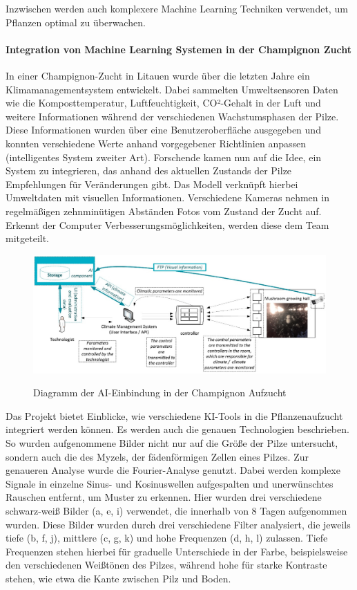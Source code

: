 Inzwischen werden auch komplexere Machine Learning Techniken verwendet, um Pflanzen optimal zu überwachen.

\paragraph{Integration von Machine Learning Systemen in der Champignon Zucht\cite{barauskas2022approach}}
In einer Champignon-Zucht in Litauen wurde über die letzten Jahre ein Klimamanagementsystem entwickelt. Dabei sammelten Umweltsensoren Daten wie die Komposttemperatur, Luftfeuchtigkeit, CO²-Gehalt in der Luft und weitere Informationen während der verschiedenen Wachstumsphasen der Pilze. Diese Informationen wurden über eine Benutzeroberfläche ausgegeben und konnten verschiedene Werte anhand vorgegebener Richtlinien anpassen (intelligentes System zweiter Art). Forschende kamen nun auf die Idee, ein System zu integrieren, das anhand des aktuellen Zustands der Pilze Empfehlungen für Veränderungen gibt. Das Modell verknüpft hierbei Umweltdaten mit visuellen Informationen. Verschiedene Kameras nehmen in regelmäßigen zehnminütigen Abständen Fotos vom Zustand der Zucht auf. Erkennt der Computer Verbesserungsmöglichkeiten, werden diese dem Team mitgeteilt.

\begin{figure}[H]
\centering
\includegraphics[width=\textwidth]{images/mushroom.jpg}
\caption{Diagramm der AI-Einbindung in der Champignon Aufzucht}\cite{rainpoint_smart_timer}\cite{barauskas2022approach}
\label{fig:mushroomDiagramm}
\end{figure}

Das Projekt bietet Einblicke, wie verschiedene KI-Tools in die Pflanzenaufzucht integriert werden können. Es werden auch die genauen Technologien beschrieben. So wurden aufgenommene Bilder nicht nur auf die Größe der Pilze untersucht, sondern auch die des Myzels, der fädenförmigen Zellen eines Pilzes. Zur genaueren Analyse wurde die Fourier-Analyse genutzt. Dabei werden komplexe Signale in einzelne Sinus- und Kosinuswellen aufgespalten und unerwünschtes Rauschen entfernt, um Muster zu erkennen.\cite{fourier_transformation} Hier wurden drei verschiedene schwarz-weiß Bilder (a, e, i) verwendet, die innerhalb von 8 Tagen aufgenommen wurden. Diese Bilder wurden durch drei verschiedene Filter analysiert, die jeweils tiefe (b, f, j), mittlere (c, g, k) und hohe Frequenzen (d, h, l) zulassen. Tiefe Frequenzen stehen hierbei für graduelle Unterschiede in der Farbe, beispielsweise den verschiedenen Weißtönen des Pilzes, während hohe für starke Kontraste stehen, wie etwa die Kante zwischen Pilz und Boden.

